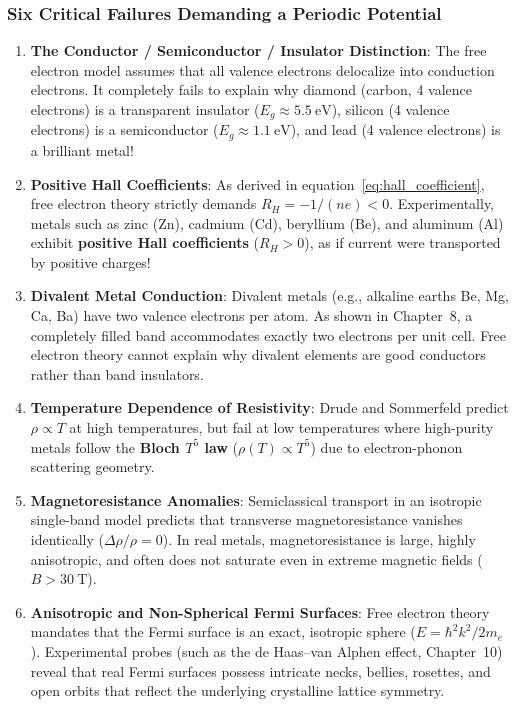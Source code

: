 \documentclass[11pt,a4paper]{article}
\begin{document}
\subsubsection{Six Critical Failures Demanding a Periodic Potential}
\begin{enumerate}[leftmargin=*]
    \item \textbf{The Conductor / Semiconductor / Insulator Distinction}: The free electron model assumes that all valence electrons delocalize into conduction electrons. It completely fails to explain why diamond (carbon, 4 valence electrons) is a transparent insulator ($E_g \approx 5.5\ \mathrm{eV}$), silicon (4 valence electrons) is a semiconductor ($E_g \approx 1.1\ \mathrm{eV}$), and lead (4 valence electrons) is a brilliant metal!
    \item \textbf{Positive Hall Coefficients}: As derived in equation~\eqref{eq:hall_coefficient}, free electron theory strictly demands $R_H = -1/(ne) < 0$. Experimentally, metals such as zinc ($\mathrm{Zn}$), cadmium ($\mathrm{Cd}$), beryllium ($\mathrm{Be}$), and aluminum ($\mathrm{Al}$) exhibit \textbf{positive Hall coefficients} ($R_H > 0$), as if current were transported by positive charges!
    \item \textbf{Divalent Metal Conduction}: Divalent metals (e.g., alkaline earths Be, Mg, Ca, Ba) have two valence electrons per atom. As shown in Chapter~8, a completely filled band accommodates exactly two electrons per unit cell. Free electron theory cannot explain why divalent elements are good conductors rather than band insulators.
    \item \textbf{Temperature Dependence of Resistivity}: Drude and Sommerfeld predict $\rho \propto T$ at high temperatures, but fail at low temperatures where high-purity metals follow the \textbf{Bloch $T^5$ law} ($\rho(T) \propto T^5$) due to electron-phonon scattering geometry.
    \item \textbf{Magnetoresistance Anomalies}: Semiclassical transport in an isotropic single-band model predicts that transverse magnetoresistance vanishes identically ($\Delta\rho/\rho = 0$). In real metals, magnetoresistance is large, highly anisotropic, and often does not saturate even in extreme magnetic fields ($B > 30\ \mathrm{T}$).
    \item \textbf{Anisotropic and Non-Spherical Fermi Surfaces}: Free electron theory mandates that the Fermi surface is an exact, isotropic sphere ($E = \hbar^2 k^2 / 2m_e$). Experimental probes (such as the de Haas--van Alphen effect, Chapter~10) reveal that real Fermi surfaces possess intricate necks, bellies, rosettes, and open orbits that reflect the underlying crystalline lattice symmetry.
\end{enumerate}
\end{document}
